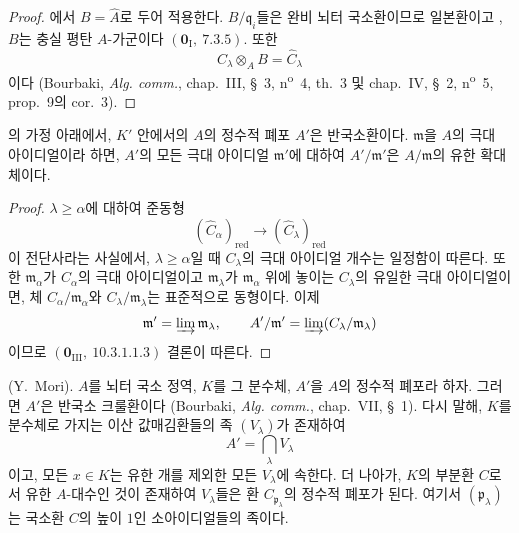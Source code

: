 
\begin{proof}
에서 $B=\widehat A$로 두어 적용한다.
$B/\mathfrak q_i$들은 완비 뇌터 국소환이므로 일본환이고
, $B$는 충실 평탄 $A$-가군이다
$(\mathbf 0_{\mathrm I},~7.3.5)$. 또한
\[
  C_\lambda\otimes_AB=\widehat C_\lambda
\]
이다 (Bourbaki, \emph{Alg. comm.}, chap.~III, §~3,
n\textsuperscript{o}~4, th.~3 및 chap.~IV, §~2,
n\textsuperscript{o}~5, prop.~9의 cor.~3).
\end{proof}

\begin{corollary}[23.2.6]
\label{0.23.2.6-ko}
의 가정 아래에서, $K'$ 안에서의 $A$의 정수적 폐포
$A'$은 반국소환이다. $\mathfrak m$을 $A$의 극대 아이디얼이라 하면,
$A'$의 모든 극대 아이디얼 $\mathfrak m'$에 대하여
$A'/\mathfrak m'$은 $A/\mathfrak m$의 유한 확대체이다.
\end{corollary}

\begin{proof}
$\lambda\geq\alpha$에 대하여 준동형
\[
  (\widehat C_\alpha)_{\mathrm{red}}
  \longrightarrow(\widehat C_\lambda)_{\mathrm{red}}
\]
이 전단사라는 사실에서, $\lambda\geq\alpha$일 때
$C_\lambda$의 극대 아이디얼 개수는 일정함이 따른다. 또한
$\mathfrak m_\alpha$가 $C_\alpha$의 극대 아이디얼이고
$\mathfrak m_\lambda$가 $\mathfrak m_\alpha$ 위에 놓이는
$C_\lambda$의 유일한 극대 아이디얼이면, 체
$C_\alpha/\mathfrak m_\alpha$와
$C_\lambda/\mathfrak m_\lambda$는 표준적으로 동형이다. 이제
\[
  \mathfrak m'=\varinjlim\mathfrak m_\lambda,\qquad
  A'/\mathfrak m'
  =\varinjlim(C_\lambda/\mathfrak m_\lambda)
\]
이므로 $(\mathbf 0_{\mathrm{III}},~10.3.1.1.3)$ 결론이 따른다.
\end{proof}

\begin{proposition}[23.2.7]
\label{0.23.2.7-ko}
\textnormal{(Y.~Mori).}
$A$를 뇌터 국소 정역, $K$를 그 분수체, $A'$을 $A$의 정수적
폐포라 하자. 그러면 $A'$은 반국소 크룰환이다
(Bourbaki, \emph{Alg. comm.}, chap.~VII, §~1). 다시 말해, $K$를
분수체로 가지는 이산 값매김환들의 족 $(V_\lambda)$가 존재하여
\[
  A'=\bigcap_\lambda V_\lambda
\]
이고, 모든 $x\in K$는 유한 개를 제외한 모든 $V_\lambda$에 속한다.
더 나아가, $K$의 부분환 $C$로서 유한 $A$-대수인 것이 존재하여
$V_\lambda$들은 환 $C_{\mathfrak p_\lambda}$의 정수적 폐포가 된다.
여기서 $(\mathfrak p_\lambda)$는 국소환 $C$의 높이 $1$인
소아이디얼들의 족이다.
\end{proposition}

